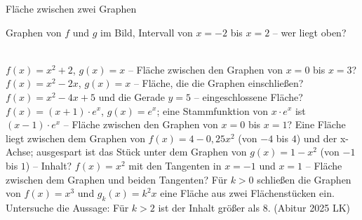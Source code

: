 \setcounter{aufgabe}{10}

\begin{aufgabe}{Fläche zwischen zwei Graphen}
\begin{teile}
\teil Graphen von $f$ und $g$ im Bild, Intervall von $x = -2$ bis $x = 2$ – wer liegt oben? \\ \\ 

\begin{ksys}[xmin=-3,xmax=4,ymin=-5,ymax=5,ablesen] \end{ksys}
\teil $f(x) = x^2 + 2$, $g(x) = x$ – Fläche zwischen den Graphen von $x = 0$ bis $x = 3$?
\teil $f(x) = x^2 - 2x$, $g(x) = x$ – Fläche, die die Graphen einschließen?
\teil $f(x) = x^2 - 4x + 5$ und die Gerade $y = 5$ – eingeschlossene Fläche?
\teil $f(x) = (x + 1) \cdot e^{x}$, $g(x) = e^{x}$; eine Stammfunktion von $x \cdot e^{x}$ ist $(x - 1) \cdot e^{x}$ – Fläche zwischen den Graphen von $x = 0$ bis $x = 1$?
\teil Eine Fläche liegt zwischen dem Graphen von $f(x) = 4 - 0{,}25x^2$ (von $-4$ bis $4$) und der x-Achse; ausgespart ist das Stück unter dem Graphen von $g(x) = 1 - x^2$ (von $-1$ bis $1$) – Inhalt?
\teil $f(x) = x^2$ mit den Tangenten in $x = -1$ und $x = 1$ – Fläche zwischen dem Graphen und beiden Tangenten?
\teil Für $k > 0$ schließen die Graphen von $f(x) = x^3$ und $g_k(x) = k^2 x$ eine Fläche aus zwei Flächenstücken ein. Untersuche die Aussage: Für $k > 2$ ist der Inhalt größer als $8$. \hfill (Abitur 2025 LK)
\end{teile}
\end{aufgabe}

